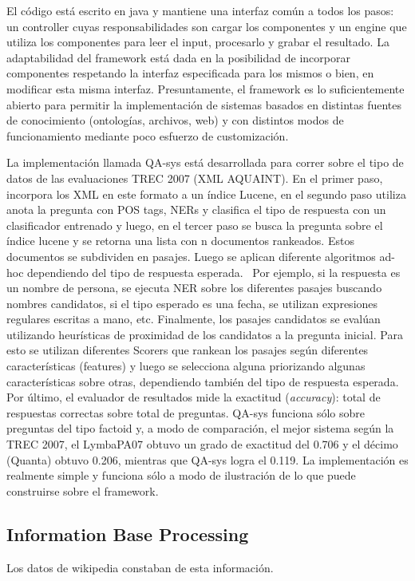 El código está escrito en java y mantiene una interfaz común a
todos los pasos: un controller cuyas responsabilidades son cargar los
componentes y un engine que utiliza los componentes para leer el input,
procesarlo y grabar el resultado. La adaptabilidad del framework está
dada en la posibilidad de incorporar componentes respetando la interfaz
especificada para los mismos o bien, en modificar esta misma interfaz.
Presuntamente, el framework es lo suficientemente abierto para permitir
la implementación de sistemas basados en distintas fuentes de
conocimiento (ontologías, archivos, web) y con distintos modos de
funcionamiento mediante poco esfuerzo de customización.

La implementación llamada QA-sys está desarrollada para correr sobre
el tipo de datos de las evaluaciones TREC 2007 (XML AQUAINT). En el
primer paso, incorpora los XML en este formato a un índice Lucene, en
el segundo paso utiliza anota la pregunta con POS tags, NERs y
clasifica el tipo de respuesta con un clasificador entrenado y luego,
en el tercer paso se busca la pregunta sobre el índice lucene y se
retorna una lista con n documentos rankeados. Estos documentos se
subdividen en pasajes. Luego se aplican diferente algoritmos ad-hoc
dependiendo del tipo de respuesta esperada. \ Por ejemplo, si la
respuesta es un nombre de persona, se ejecuta NER sobre los diferentes
pasajes buscando nombres candidatos, si el tipo esperado es una fecha,
se utilizan expresiones regulares escritas a mano, etc. Finalmente, los
pasajes candidatos se evalúan utilizando heurísticas de proximidad
de los candidatos a la pregunta inicial. Para esto se utilizan
diferentes Scorers que rankean los pasajes según diferentes
características (features) y luego se selecciona alguna priorizando
algunas características sobre otras, dependiendo también del tipo
de respuesta esperada. Por último, el evaluador de resultados mide la
exactitud (\textit{accuracy}): total de respuestas correctas sobre
total de preguntas. QA-sys funciona sólo sobre preguntas del tipo
factoid y, a modo de comparación, el mejor sistema según la TREC
2007, el LymbaPA07 obtuvo un grado de exactitud del 0.706 y el décimo
(Quanta) obtuvo 0.206, mientras que QA-sys logra el 0.119. La
implementación es realmente simple y funciona sólo a modo de
ilustración de lo que puede construirse sobre el framework. 


\subsection{Information Base Processing}
Los datos de wikipedia constaban de esta información.
